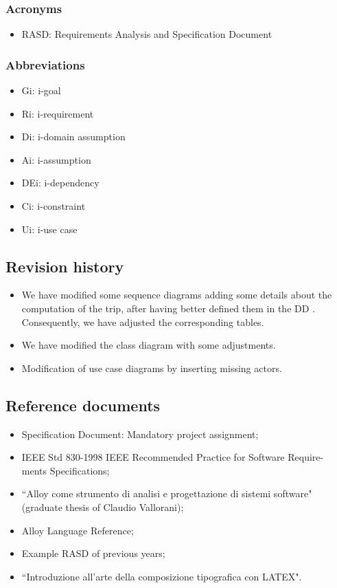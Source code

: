 \documentclass[12pt,titlepage]{article}
\begin{document}
\subsubsection{Acronyms}\label{RASD}
\begin{itemize}
\item	RASD: Requirements Analysis and Specification Document
\end{itemize}
\subsubsection{Abbreviations}\label{RASD}
\begin{itemize}
\item	Gi: i-goal
\item	Ri: i-requirement
\item	Di: i-domain assumption
\item Ai: i-assumption 
\item DEi: i-dependency
\item Ci: i-constraint
\item Ui: i-use case
\end{itemize}
\subsection{Revision history}\label{RASD}
\begin{itemize}
\item We have modified some sequence diagrams adding some details about the computation of the trip, after having better defined them in the DD . Consequently, we have adjusted the corresponding tables.
\item We have modified the class diagram with some adjustments.


\end{itemize}
\begin{itemize}
\item Modification of use case diagrams by inserting missing actors.
\end{itemize}
\subsection{Reference documents}\label{RASD}
\begin{itemize}
\item Specification Document: Mandatory project assignment;
\item IEEE Std 830-1998 IEEE Recommended Practice for Software Require-
ments Specifications;
\item``Alloy come strumento di analisi e progettazione di sistemi software" (graduate thesis of Claudio Vallorani);
\item Alloy Language Reference;
\item Example RASD of previous years;
\item ``Introduzione all'arte della composizione tipografica con LATEX".
\end{itemize}
\end{document}
